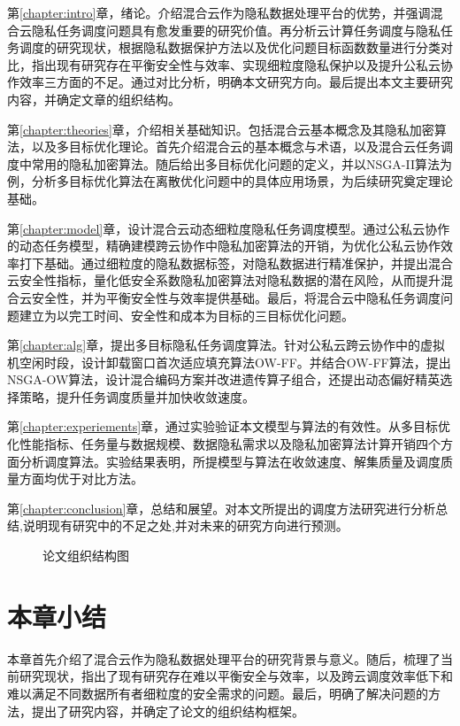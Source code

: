 第\ref{chapter:intro}章，绪论。介绍混合云作为隐私数据处理平台的优势，并强调混合云隐私任务调度问题具有愈发重要的研究价值。再分析云计算任务调度与隐私任务调度的研究现状，根据隐私数据保护方法以及优化问题目标函数数量进行分类对比，指出现有研究存在平衡安全性与效率、实现细粒度隐私保护以及提升公私云协作效率三方面的不足。通过对比分析，明确本文研究方向。最后提出本文主要研究内容，并确定文章的组织结构。

第\ref{chapter:theories}章，介绍相关基础知识。包括混合云基本概念及其隐私加密算法，以及多目标优化理论。首先介绍混合云的基本概念与术语，以及混合云任务调度中常用的隐私加密算法。随后给出多目标优化问题的定义，并以NSGA-II算法为例，分析多目标优化算法在离散优化问题中的具体应用场景，为后续研究奠定理论基础。

第\ref{chapter:model}章，设计混合云动态细粒度隐私任务调度模型。通过公私云协作的动态任务模型，精确建模跨云协作中隐私加密算法的开销，为优化公私云协作效率打下基础。通过细粒度的隐私数据标签，对隐私数据进行精准保护，并提出混合云安全性指标，量化低安全系数隐私加密算法对隐私数据的潜在风险，从而提升混合云安全性，并为平衡安全性与效率提供基础。最后，将混合云中隐私任务调度问题建立为以完工时间、安全性和成本为目标的三目标优化问题。

第\ref{chapter:alg}章，提出多目标隐私任务调度算法。针对公私云跨云协作中的虚拟机空闲时段，设计卸载窗口首次适应填充算法OW-FF。并结合OW-FF算法，提出NSGA-OW算法，设计混合编码方案并改进遗传算子组合，还提出动态偏好精英选择策略，提升任务调度质量并加快收敛速度。

第\ref{chapter:experiements}章，通过实验验证本文模型与算法的有效性。从多目标优化性能指标、任务量与数据规模、数据隐私需求以及隐私加密算法计算开销四个方面分析调度算法。实验结果表明，所提模型与算法在收敛速度、解集质量及调度质量方面均优于对比方法。

第\ref{chapter:conclusion}章，总结和展望。对本文所提出的调度方法研究进行分析总结,说明现有研究中的不足之处,并对未来的研究方向进行预测。

\begin{figure}[htb!]
    
    \caption{论文组织结构图}\label{fig:thesis-outline}
\end{figure}

\section{本章小结}
本章首先介绍了混合云作为隐私数据处理平台的研究背景与意义。随后，梳理了当前研究现状，指出了现有研究存在难以平衡安全与效率，以及跨云调度效率低下和难以满足不同数据所有者细粒度的安全需求的问题。最后，明确了解决问题的方法，提出了研究内容，并确定了论文的组织结构框架。
